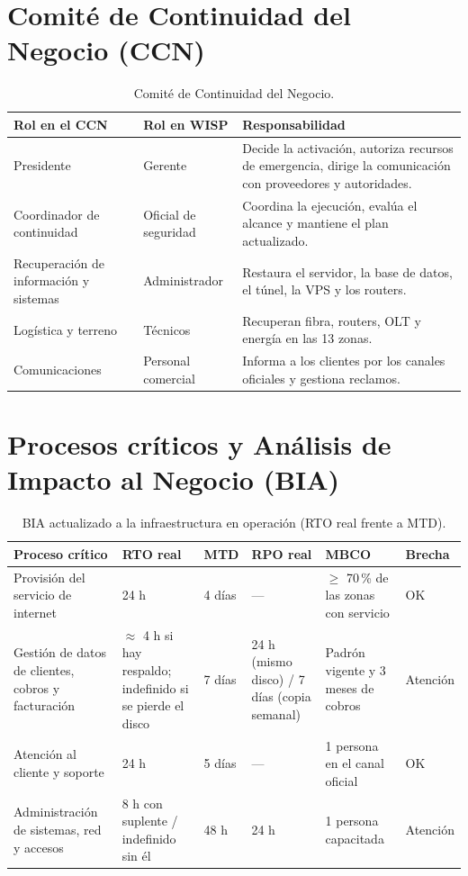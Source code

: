 \section{Comité de Continuidad del Negocio (CCN)}

\begin{table}[H]
\centering
\caption{Comité de Continuidad del Negocio.}
\label{tab:anx-pcn-ccn}
\small
\begin{tabularx}{\textwidth}{L{3.4cm}L{2.6cm}X}
\toprule
\textbf{Rol en el CCN} & \textbf{Rol en WISP} & \textbf{Responsabilidad} \\
\midrule
Presidente & Gerente & Decide la activación, autoriza recursos de emergencia, dirige la comunicación con proveedores y autoridades. \\
Coordinador de continuidad & Oficial de seguridad & Coordina la ejecución, evalúa el alcance y mantiene el plan actualizado. \\
Recuperación de información y sistemas & Administrador & Restaura el servidor, la base de datos, el túnel, la VPS y los routers. \\
Logística y terreno & Técnicos & Recuperan fibra, routers, OLT y energía en las 13 zonas. \\
Comunicaciones & Personal comercial & Informa a los clientes por los canales oficiales y gestiona reclamos. \\
\bottomrule
\end{tabularx}
\end{table}

\section{Procesos críticos y Análisis de Impacto al Negocio (BIA)}

\begin{table}[H]
\centering
\caption{BIA actualizado a la infraestructura en operación (RTO real frente a MTD).}
\label{tab:anx-pcn-bia}
\small
\begin{tabularx}{\textwidth}{L{3.2cm}L{2.3cm}C{1cm}L{1.9cm}L{2.2cm}L{1.4cm}}
\toprule
\textbf{Proceso crítico} & \textbf{RTO real} & \textbf{MTD} & \textbf{RPO real} & \textbf{MBCO} & \textbf{Brecha} \\
\midrule
Provisión del servicio de internet & 24 h & 4 días & --- & $\geq$ 70\,\% de las zonas con servicio & OK \\
Gestión de datos de clientes, cobros y facturación & $\approx$ 4 h si hay respaldo; indefinido si se pierde el disco & 7 días & 24 h (mismo disco) / 7 días (copia semanal) & Padrón vigente y 3 meses de cobros & Atención \\
Atención al cliente y soporte & 24 h & 5 días & --- & 1 persona en el canal oficial & OK \\
Administración de sistemas, red y accesos & 8 h con suplente / indefinido sin él & 48 h & 24 h & 1 persona capacitada & Atención \\
\bottomrule
\end{tabularx}
\end{table}

